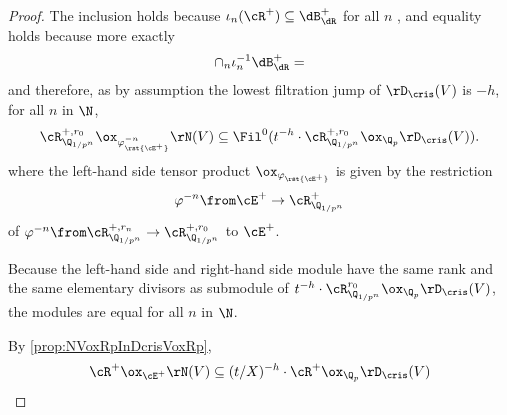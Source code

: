 \begin{proof}
  The inclusion holds because $\iota_n (\cR^+) \subseteq \dB_\dR^+$ for all $n$ , and equality holds because more exactly
  \[
    \cap_n \iota_n^{-1} \dB_\dR^+ =
  \]
  and therefore, as by assumption the lowest filtration jump of $\rD_\cris(V)$ is $-h$, for all $n$ in $\N$,
  \[
    \cR_{\Q_{1/p^n}}^{+, r_0} \ox_{\varphi^{-n}_\rst{\cE^+}} \rN(V) \subseteq \Fil^0 ( t^{-h} \cdot \cR_{\Q_{1/p^n}}^{+, r_0} \ox_{\Q_p} \rD_\cris(V) ).
  \]
  where the left-hand side tensor product $\ox_{\varphi_{\rst{\cE^+}}}$ is given by the restriction
  \[
    \varphi^{-n} \from \cE^+ \to \cR^+_{\Q_{1/p^n}}
  \]
  of $\varphi^{-n} \from \cR^{+, r_n}_{\Q_{1/p^n}} \to \cR^{+, r_0}_{\Q_{1/p^n}}$ to $\cE^+$.

  Because the left-hand side and right-hand side module have the same rank and the same elementary divisors as submodule of $ t^{-h} \cdot \cR_{\Q_{1/p^n}}^{r_0} \ox_{\Q_p} \rD_\cris(V) $, the modules are equal for all $n$ in $\N$.

  By \cref{prop:NVoxRpInDcrisVoxRp},
  \[
    \cR^+ \ox_{\cE^+} \rN(V) \subseteq (t/X)^{-h} \cdot \cR^+ \ox_{\Q_p} \rD_\cris(V)
  \]
\end{proof}

